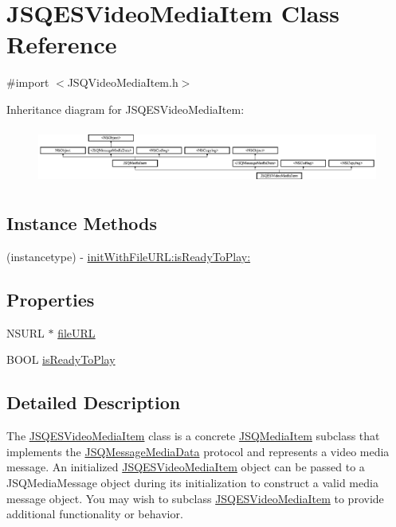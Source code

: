 \hypertarget{interface_j_s_q_e_s_video_media_item}{}\section{J\+S\+Q\+E\+S\+Video\+Media\+Item Class Reference}
\label{interface_j_s_q_e_s_video_media_item}


{\ttfamily \#import $<$J\+S\+Q\+Video\+Media\+Item.\+h$>$}

Inheritance diagram for J\+S\+Q\+E\+S\+Video\+Media\+Item\+:\begin{figure}[H]
\begin{center}
\leavevmode
\includegraphics[height=1.871345cm]{interface_j_s_q_e_s_video_media_item}
\end{center}
\end{figure}
\subsection*{Instance Methods}
\begin{DoxyCompactItemize}
\item 
(instancetype) -\/ \hyperlink{interface_j_s_q_e_s_video_media_item_a5fa02584c5cfd904bb8e476860932c6d}{init\+With\+File\+U\+R\+L\+:is\+Ready\+To\+Play\+:}
\end{DoxyCompactItemize}
\subsection*{Properties}
\begin{DoxyCompactItemize}
\item 
N\+S\+U\+R\+L $\ast$ \hyperlink{interface_j_s_q_e_s_video_media_item_a1bb33ad4c3f4d362443b909a818ebf5a}{file\+U\+R\+L}
\item 
B\+O\+O\+L \hyperlink{interface_j_s_q_e_s_video_media_item_a39bcd17dda91c3887c51eb9758011569}{is\+Ready\+To\+Play}
\end{DoxyCompactItemize}


\subsection{Detailed Description}
The {\ttfamily \hyperlink{interface_j_s_q_e_s_video_media_item}{J\+S\+Q\+E\+S\+Video\+Media\+Item}} class is a concrete {\ttfamily \hyperlink{interface_j_s_q_media_item}{J\+S\+Q\+Media\+Item}} subclass that implements the {\ttfamily \hyperlink{protocol_j_s_q_message_media_data-p}{J\+S\+Q\+Message\+Media\+Data}} protocol and represents a video media message. An initialized {\ttfamily \hyperlink{interface_j_s_q_e_s_video_media_item}{J\+S\+Q\+E\+S\+Video\+Media\+Item}} object can be passed to a {\ttfamily J\+S\+Q\+Media\+Message} object during its initialization to construct a valid media message object. You may wish to subclass {\ttfamily \hyperlink{interface_j_s_q_e_s_video_media_item}{J\+S\+Q\+E\+S\+Video\+Media\+Item}} to provide additional functionality or behavior. 

